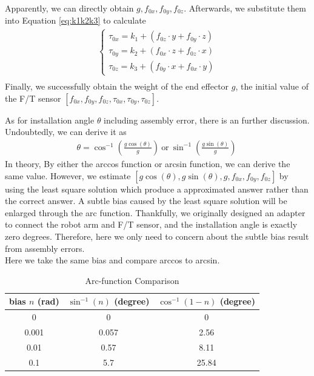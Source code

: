 Apparently, we can directly obtain $g,f_{0x},f_{0y},f_{0z}$. Afterwards, we substitute them into Equation \ref{eq:k1k2k3} to calculate 
\begin{equation}
\begin{split}
\left\{\begin{matrix}
\tau _{0x}	=	k_1	+ \left( f_{0z} \cdot y + f_{0y} \cdot z \right) \\
\tau _{0y} 	=	k_2	+ \left( f_{0x} \cdot z + f_{0z} \cdot x \right) \\
\tau _{0z} 	=	k_3 + \left( f_{0y} \cdot x + f_{0x} \cdot y \right)
\end{matrix}\right.\\
\end{split}
\end{equation}
Finally, we successfully obtain the weight of the end effector $g$, the initial value of the F/T sensor $[f_{0x},f_{0y},f_{0z},\tau_{0x},\tau_{0y},\tau_{0z}]$.
\par
As for installation angle $\theta$ including assembly error,  there is an further discussion. Undoubtedly, we can derive it as
\begin{equation}
\begin{split}
\theta = \cos^{-1}\left(\frac{g\cos(\theta)}{g}\right)\ \text{or} \ \sin^{-1}\left(\frac{g\sin(\theta)}{g}\right)\
\end{split}
\end{equation}
In theory, By either the arccos function or arcsin function, we can derive the same value. However, we estimate $[g\cos(\theta),g\sin(\theta),g,f_{0x},f_{0y},f_{0z}]$ by using the least square solution which produce a approximated answer rather than the correct answer. A subtle bias caused by the least square solution will be enlarged through the arc function. 
Thankfully, we originally designed an adapter to connect the robot arm and F/T sensor, and the installation angle is exactly zero degrees. Therefore, here we only need to concern about the subtle bias result from assembly errors.\\
Here we take the same bias and compare arccos to arcsin. 
\begin{table}[htbp]
\centering
\caption{Arc-function Comparison}
\label{tab:arc}
\begin{tabular}{c|c|c} 
\hline \hline
bias $n$ (rad)	&$\sin^{-1}(n)$	(degree)	&$\cos^{-1}(1-n)$ (degree)\\
\hline
0				&0							&0\\
0.001			&0.057						&2.56\\
0.01			&0.57						&8.11\\
0.1				&5.7						&25.84\\
\hline\hline
\end{tabular}
\end{table}
